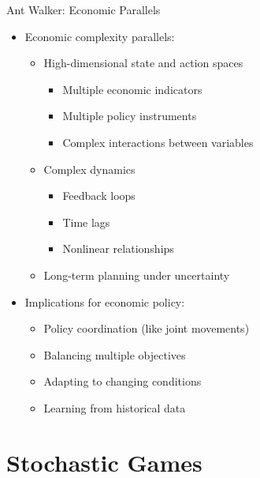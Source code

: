 \documentclass[10pt]{beamer}
\begin{document}
\begin{frame}{Ant Walker: Economic Parallels}
    \begin{itemize}
        \item Economic complexity parallels:
        \begin{itemize}
            \item High-dimensional state and action spaces
            \begin{itemize}
                \item Multiple economic indicators
                \item Multiple policy instruments
                \item Complex interactions between variables
            \end{itemize}
            \item Complex dynamics
            \begin{itemize}
                \item Feedback loops
                \item Time lags
                \item Nonlinear relationships
            \end{itemize}
            \item Long-term planning under uncertainty
        \end{itemize}
        \vspace{0.2cm}
        \item Implications for economic policy:
        \begin{itemize}
            \item Policy coordination (like joint movements)
            \item Balancing multiple objectives
            \item Adapting to changing conditions
            \item Learning from historical data
        \end{itemize}
    \end{itemize}
\end{frame}


\section{Stochastic Games}
\end{document}
